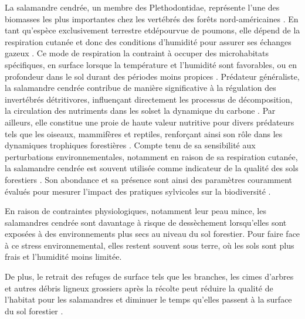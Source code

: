 La salamandre cendrée, un membre des Plethodontidae, représente l'une des biomasses les plus importantes chez les vertébrés des forêts nord-américaines \citep{Burton1975Salamanderpopulations,Petranka1993Effectstimber,semlitschAbundanceBiomassProduction2014a}. 
En tant qu'espèce exclusivement terrestre etdépourvue de poumons, elle dépend de la respiration cutanée et donc des conditions d'humidité pour assurer ses échanges gazeux \citep{Heatwole1961Relationsubstrate}. 
Ce mode de respiration la contraint à occuper des microhabitats spécifiques, en surface lorsque la température et l'humidité sont favorables, ou en profondeur dans le sol durant des périodes moins propices \citep{Grizzell1949HibernationSite,FraserEmpiricalEvaluation1976,Jaeger1980MicrohabitatsTerrestrial}. 
Prédateur généraliste, la salamandre cendrée contribue de manière significative à la régulation des invertébrés détritivores, influençant directement les processus de décomposition, la circulation des nutriments dans les solset la dynamique du carbone \citep{Burton1975Energyflow,Wyman1998Experimentalassessment,Walton2013Topdownregulation,Hickerson2017Easternredbacked}. 
Par ailleurs, elle constitue une proie de haute valeur nutritive pour divers prédateurs tels que les oiseaux, mammifères et reptiles, renforçant ainsi son rôle dans les dynamiques trophiques forestières \citep{Burton1975Energyflow,Pough1987abundancesalamanders,Petranka1998SalamandersUnited}. 
Compte tenu de sa sensibilité aux perturbations environnementales, notamment en raison de sa respiration cutanée, la salamandre cendrée est souvent utilisée comme indicateur de la qualité des sols forestiers \citep{Welsh2001caseusing}. 
Son abondance et sa présence sont ainsi des paramètres couramment évalués pour mesurer l'impact des pratiques sylvicoles sur la biodiversité \citep{Harpole1999Effectsseven,Grialou2000effectsforest,Homyack2009Longtermeffects,Hocking2013Effectsexperimental,Mazerolle2021Woodlandsalamander}. 



En raison de contraintes physiologiques, notamment leur peau mince, les salamandres cendrée sont davantage à risque de dessèchement lorsqu'elles sont exposées à des environnements plus secs au niveau du sol forestier. 
Pour faire face à ce stress environnemental, elles restent souvent sous terre, où les sols sont plus frais et l'humidité moins limitée. 

De plus, le retrait des refuges de surface tels que les branches, les cimes d'arbres et autres débris ligneux grossiers après la récolte peut réduire la qualité de l'habitat pour les salamandres 
et diminuer le temps qu'elles passent à la surface du sol forestier \citep{Achat2015Quantifyingconsequences,Peele2017EffectsWoody}. 

